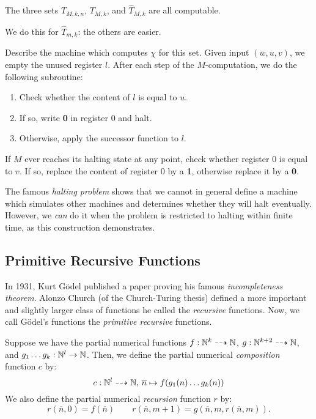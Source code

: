 \documentclass{article}
\begin{document}
\begin{proposition}
	The three sets $T_{M,k,n}$, $T_{M,k}$, and $\hat T_{M,k}$ are all computable.
\end{proposition}

\begin{prf}
	We do this for $\hat T_{m,k}$: the others are easier.
	    
	Describe the machine which computes $\chi$ for this set. Given input $(\overline w, u, v)$, we empty the unused register $l$. After each step of the $M$-computation, we do the following subroutine:
	\begin{enumerate}
		\item Check whether the content of $l$ is equal to $u$.
		\item If so, write \textbf{0} in register 0 and halt.
		\item Otherwise, apply the successor function to $l$.
	\end{enumerate}
	If $M$ ever reaches its halting state at any point, check whether register 0 is equal to $v$. If so, replace the content of register 0 by a \textbf{1}, otherwise replace it by a \textbf{0}.
\end{prf}

\begin{corollary}
	The famous \textit{halting problem} shows that we cannot in general define a machine which simulates other machines and determines whether they will halt eventually. However, we \textit{can} do it when the problem is restricted to halting within finite time, as this construction demonstrates.
\end{corollary}

\subsection{Primitive Recursive Functions}

In 1931, Kurt G\"odel published a paper proving his famous \textit{incompleteness theorem}. Alonzo Church (of the Church-Turing thesis) defined a more important and slightly larger class of functions he called the \textit{recursive} functions. Now, we call G\"odel's functions the \textit{primitive recursive} functions.

\begin{definition}
	Suppose we have the partial numerical functions $f: \mathbb{N}^k \dashrightarrow \mathbb{N}$, $g: \mathbb{N}^{k+2} \dashrightarrow \mathbb{N}$, and $g_1 \dots g_k : \mathbb{N}^l \to \mathbb{N}$. Then, we define the partial numerical \textit{composition} function $c$ by:
	\[
		c: \mathbb{N}^l \dashrightarrow \mathbb{N}, \, \overline n \mapsto f(g_1(n) \dots g_k(n))
	\]
	We also define the partial numerical \textit{recursion} function $r$ by:
	\[
		r(\overline n, 0) = f(\overline n) \qquad r(\overline n, m+1) = g(\overline n, m, r(\overline n, m)).
	\]
\end{definition}
\end{document}

